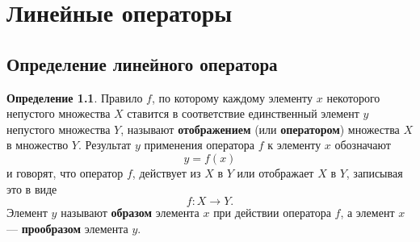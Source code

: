\documentclass[a5paper, 11pt]{extbook}
\theoremstyle{definition}
\theoremstyle{definition}
\newtheorem{definition}{Определение}[chapter]
\begin{document}






\chapter{Линейные операторы}

\section{Определение линейного оператора}

\begin{definition}
    Правило \(f\), по которому каждому элементу \(x\) некоторого непустого множества \(X\) ставится в соответствие единственный элемент \(y\) непустого множества \(Y\), называют \textbf{отображением} (или \textbf{оператором}) множества \(X\) в множество \(Y\). Результат \(y\) применения оператора \(f\) к элементу \(x\) обозначают
    \[
        y = f(x)
    \]
    и говорят, что оператор \(f\), действует из \(X\) в \(Y\) или отображает \(X\) в \(Y\), записывая это в виде
    \[
        f: X \to Y.
    \]
    Элемент \(y\) называют \textbf{образом} элемента \(x\) при действии оператора \(f\), а элемент \(x\) — \textbf{прообразом} элемента \(y\).
\end{definition}
\end{document}
